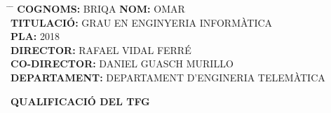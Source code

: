 \begin{titlepage}
    \begin{center}

        \begin{tcolorbox}
            \begin{minipage}{\textwidth}
                \begin{flushleft}
                    \begin{tabbing}
                        \hspace{2in} \= \hspace{1.5in} \= \kill
                        \textbf{COGNOMS:} BRIQA \> \textbf{NOM:} OMAR \\ [0.2cm]
                        \textbf{TITULACIÓ:} GRAU EN ENGINYERIA INFORMÀTICA \\ [0.2cm]
                        \textbf{PLA:} 2018 \\ [0.2cm]
                        \textbf{DIRECTOR:} RAFAEL VIDAL FERRÉ \\ [0.2cm]
                        \textbf{CO-DIRECTOR:} DANIEL GUASCH MURILLO \\ [0.2cm]
                        \textbf{DEPARTAMENT:} DEPARTAMENT D’ENGINERIA TELEMÀTICA
                    \end{tabbing}
                \end{flushleft}
            \end{minipage}
        \end{tcolorbox}

        \vspace{1.5cm}


        \begin{tcolorbox}
            \centering
                \textbf{QUALIFICACIÓ DEL TFG}
                \vspace{2cm}
        \end{tcolorbox}

        \vspace{1.5cm}


\end{center}
\end{titlepage}
